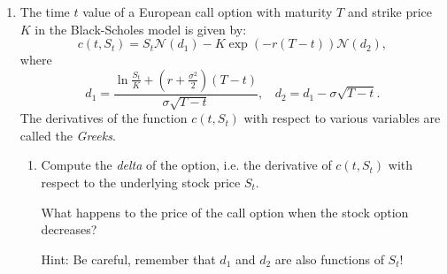 \documentclass[handout,8pt]{beamer}
\begin{document}
\begin{frame}[allowframebreaks]{ }
\begin{enumerate}
    \item The time $t$ value of a European call option with maturity $T$ and strike price $K$ in the Black-Scholes model is given by:
    \begin{equation}
        c(t,S_t) = S_t \mathcal{N}(d_1) - K \exp(-r(T-t))\mathcal{N}(d_2),
    \end{equation}
    where
    \begin{equation*}
        d_1=\frac{\ln \frac{S_t}{K} + \left(r+\frac{\sigma^2}{2}\right)(T-t)}{\sigma\sqrt{T-t}},~~~~ d_2=d_1 - \sigma \sqrt{T-t}.
    \end{equation*}
    The derivatives of the function $c(t,S_t)$ with respect to various variables are called the \textit{Greeks}.
    \begin{enumerate}
        \item Compute the \textit{delta} of the option, i.e. the derivative of $c(t,S_t)$ with respect to the underlying stock price $S_t$. \newline 
        
        What happens to the price of the call option when the stock option decreases?\newline
        
        Hint: Be careful, remember that $d_1$ and $d_2$ are also functions of $S_t$! \newline
        

\end{enumerate}
\end{enumerate}
\end{frame}
\end{document}

